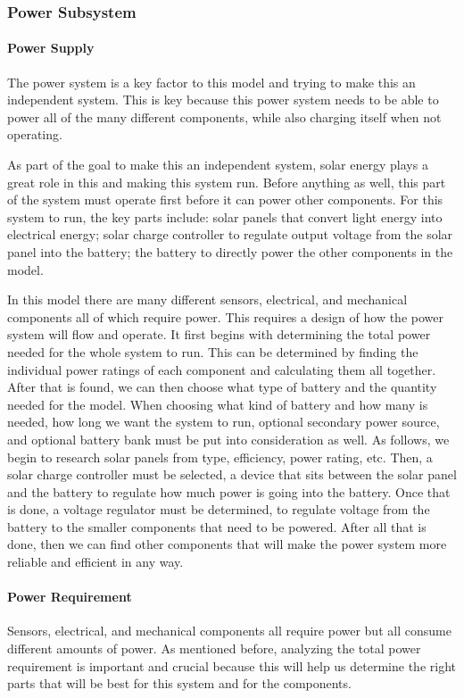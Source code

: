 
\subsubsection{Power Subsystem}\label{sec:ps-power}
\paragraph{Power Supply}
The power system is a key factor to this model and trying to make this an independent system. This is key because this power system needs to be able to power all of the many different components, while also charging itself when not operating.

As part of the goal to make this an independent system, solar energy plays a great role in this and making this system run. Before anything as well, this part of the system must operate first before it can power other components. For this system to run, the key parts include: solar panels that convert light energy into electrical energy; solar charge controller to regulate output voltage from the solar panel into the battery; the battery to directly power the other components in the model.

In this model there are many different sensors, electrical, and mechanical components all of which require power. This requires a design of how the power system will flow and operate. It first begins with determining the total power needed for the whole system to run. This can be determined by finding the individual power ratings of each component and calculating them all together. After that is found, we can then choose what type of battery and the quantity needed for the model. When choosing what kind of battery and how many is needed, how long we want the system to run, optional secondary power source, and optional battery bank must be put into consideration as well. As follows, we begin to research solar panels from type, efficiency, power rating, etc. Then, a solar charge controller must be selected, a device that sits between the solar panel and the battery to regulate how much power is going into the battery. Once that is done, a voltage regulator must be determined, to regulate voltage from the battery to the smaller components that need to be powered. After all that is done, then we can find other components that will make the power system more reliable and efficient in any way.

\paragraph{Power Requirement}
Sensors, electrical, and mechanical components all require power but all consume different amounts of power. As mentioned before, analyzing the total power requirement is important and crucial because this will help us determine the right parts that will be best for this system and for the components.

